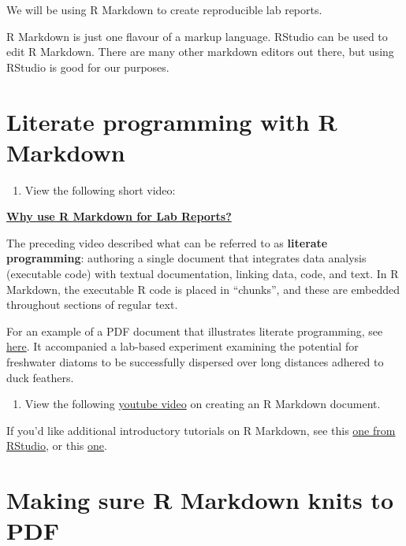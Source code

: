 \documentclass[
]{book}
\providecommand{\tightlist}{%
  \setlength{\itemsep}{0pt}\setlength{\parskip}{0pt}}
\begin{document}
We will be using R Markdown to create reproducible lab reports.

R Markdown is just one flavour of a markup language. RStudio can be used to edit R Markdown. There are many other markdown editors out there, but using RStudio is good for our purposes.

\section{Literate programming with R Markdown}\label{lit_programming}

\begin{enumerate}
\def\labelenumi{\arabic{enumi}.}
\tightlist
\item
  View the following short video:
\end{enumerate}

\href{https://youtu.be/lNWVQ2oxNho}{\textbf{Why use R Markdown for Lab Reports?}}

The preceding video described what can be referred to as \textbf{literate programming}: authoring a single document that integrates data analysis (executable code) with textual documentation, linking data, code, and text. In R Markdown, the executable R code is placed in ``chunks'', and these are embedded throughout sections of regular text.

For an example of a PDF document that illustrates literate programming, see \href{https://osf.io/59j4b}{here}. It accompanied a lab-based experiment examining the potential for freshwater diatoms to be successfully dispersed over long distances adhered to duck feathers.

\begin{enumerate}
\def\labelenumi{\arabic{enumi}.}
\setcounter{enumi}{1}
\tightlist
\item
  View the following \href{https://www.youtube.com/watch?v=asHhuHRxhvo}{youtube video} on creating an R Markdown document.
\end{enumerate}

If you'd like additional introductory tutorials on R Markdown, see this \href{https://rmarkdown.rstudio.com/lesson-1.html}{one from RStudio}, or this \href{https://rbasics.netlify.app/4-rmarkdown.html}{one}.

\section{Making sure R Markdown knits to PDF}\label{veryify_knit}
\end{document}
